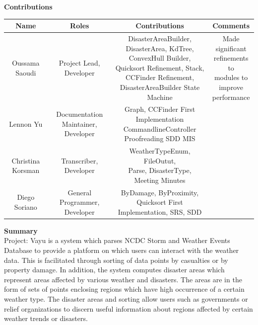 \documentclass[12pt]{article}
\begin{document}
\newpage
\Large \textbf{Contributions}
\normalsize
\begin{adjustwidth}{-1.2cm}{}
\begin{center}
    \begin{tabular}{| c | c | c | c  || } 
    \hline
    Name & Roles & Contributions & Comments\\
    \hline\hline
     Oussama Saoudi & \makecell{Project Lead,\\Developer} & \makecell{DisasterAreaBuilder, \\ DisasterArea, KdTree,\\ ConvexHull Builder, \\ Quicksort Refinement, Stack, \\ CCFinder Refinement,  \\ DisasterAreaBuilder State \\ Machine} & \makecell{Made \\significant \\refinements to\\ modules to\\ improve \\ performance}\\ 
    \hline
    Lennon Yu & \makecell{Documentation Maintainer,\\ Developer} & \makecell{Graph, CCFinder First Implementation \\ CommandlineController \\ Proofreading SDD MIS} &\\
    \hline
    Christina Korsman & Transcriber, Developer &  \makecell{WeatherTypeEnum, FileOutut, \\ Parse, DisasterType, \\ Meeting Minutes} & \\
    \hline
    Diego Soriano & \makecell{General Programmer, \\Developer} & \makecell{ByDamage, ByProximity, \\Quicksort First Implementation, SRS, SDD} &\\
    \hline
\end{tabular}
\end{center}
\end{adjustwidth}
\newpage
\Large \noindent \textbf{Summary}\\
\normalsize
Project: Vayu is a system which parses NCDC Storm and Weather Events Database to provide a platform on which users can interact with the weather data. This is facilitated through sorting of data points by casualties or by property damage. In addition, the system computes disaster areas which represent areas affected by various weather and disasters. The areas are in the form of sets of points enclosing regions which have high occurrence of a certain weather type. The disaster areas and sorting allow users such as governments or relief organizations to discern useful information about regions affected by certain weather trends or disasters.
 
\end{document}
